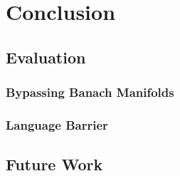 \documentclass[12pt]{ociamthesis}  %
\begin{document}
\missingsection

\chapter{Conclusion}

\missingsection

\section{Evaluation}

\missingsection

\subsection{Bypassing Banach Manifolds}

\missingsection

\subsection{Language Barrier}

\missingsection

\section{Future Work}

\missingsection

\pagebreak
\renewcommand{\bibname}{References}
\printbibliography
\end{document}
